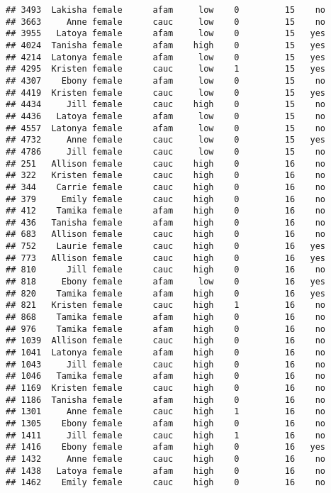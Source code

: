 \documentclass[
]{article}
\begin{document}
\begin{verbatim}
## 3493  Lakisha female      afam     low    0         15    no
## 3663     Anne female      cauc     low    0         15    no
## 3955   Latoya female      afam     low    0         15   yes
## 4024  Tanisha female      afam    high    0         15   yes
## 4214  Latonya female      afam     low    0         15   yes
## 4295  Kristen female      cauc     low    1         15   yes
## 4307    Ebony female      afam     low    0         15    no
## 4419  Kristen female      cauc     low    0         15   yes
## 4434     Jill female      cauc    high    0         15    no
## 4436   Latoya female      afam     low    0         15    no
## 4557  Latonya female      afam     low    0         15    no
## 4732     Anne female      cauc     low    0         15   yes
## 4786     Jill female      cauc     low    0         15    no
## 251   Allison female      cauc    high    0         16    no
## 322   Kristen female      cauc    high    0         16    no
## 344    Carrie female      cauc    high    0         16    no
## 379     Emily female      cauc    high    0         16    no
## 412    Tamika female      afam    high    0         16    no
## 436   Tanisha female      afam    high    0         16    no
## 683   Allison female      cauc    high    0         16    no
## 752    Laurie female      cauc    high    0         16   yes
## 773   Allison female      cauc    high    0         16   yes
## 810      Jill female      cauc    high    0         16    no
## 818     Ebony female      afam     low    0         16   yes
## 820    Tamika female      afam    high    0         16   yes
## 821   Kristen female      cauc    high    1         16    no
## 868    Tamika female      afam    high    0         16    no
## 976    Tamika female      afam    high    0         16    no
## 1039  Allison female      cauc    high    0         16    no
## 1041  Latonya female      afam    high    0         16    no
## 1043     Jill female      cauc    high    0         16    no
## 1046   Tamika female      afam    high    0         16    no
## 1169  Kristen female      cauc    high    0         16    no
## 1186  Tanisha female      afam    high    0         16    no
## 1301     Anne female      cauc    high    1         16    no
## 1305    Ebony female      afam    high    0         16    no
## 1411     Jill female      cauc    high    1         16    no
## 1416    Ebony female      afam    high    0         16   yes
## 1432     Anne female      cauc    high    0         16    no
## 1438   Latoya female      afam    high    0         16    no
## 1462    Emily female      cauc    high    0         16    no

\end{verbatim}
\end{document}
